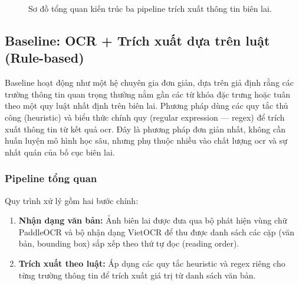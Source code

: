 \begin{figure}[htbp]
{
  }
  \caption{Sơ đồ tổng quan kiến trúc ba pipeline trích xuất thông tin biên lai.}
  \label{fig:pipeline_overview}
\end{figure}


\subsection{Baseline: OCR + Trích xuất dựa trên luật (Rule-based)}
\label{subsec:baseline}

Baseline hoạt động như một hệ chuyên gia đơn giản, dựa trên giả định rằng các trường thông tin quan trọng thường nằm gần các từ khóa đặc trưng hoặc tuân theo một quy luật nhất định trên biên lai.
Phương pháp dùng các quy tắc thủ công (heuristic) và
biểu thức chính quy (regular expression — regex) để trích xuất thông tin từ
kết quả \gls{ocr}. Đây là phương pháp đơn giản nhất, không cần huấn luyện
mô hình học sâu, nhưng phụ thuộc nhiều vào chất lượng \gls{ocr} và sự nhất
quán của bố cục biên lai.

\subsubsection{Pipeline tổng quan}
\label{subsubsec:baseline_pipeline}

Quy trình xử lý gồm hai bước chính:

\begin{enumerate}
  \item \textbf{Nhận dạng văn bản:} Ảnh biên lai được đưa qua bộ phát hiện
    vùng chữ PaddleOCR \cite{du2020ppocr} và bộ nhận dạng VietOCR
    \cite{vietocr2020} để thu được danh sách các cặp (văn bản, bounding box)
    sắp xếp theo thứ tự đọc (reading order).

  \item \textbf{Trích xuất theo luật:} Áp dụng các quy tắc heuristic và regex
    riêng cho từng trường thông tin để trích xuất giá trị từ danh sách văn bản.
\end{enumerate}

